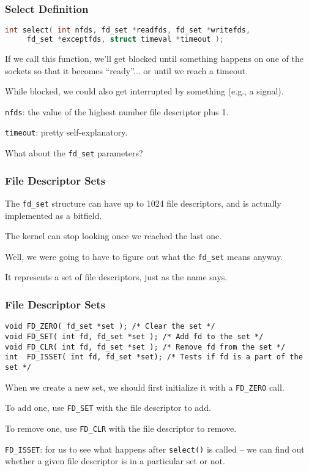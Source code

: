 \begin{frame}[fragile]
	\frametitle{Select Definition}

	\begin{lstlisting}[language=C]
 int select( int nfds, fd_set *readfds, fd_set *writefds, 
     fd_set *exceptfds, struct timeval *timeout );
\end{lstlisting}

	If we call this function, we'll get blocked until something happens on one of the sockets so that it becomes ``ready''... or until we reach a timeout.

	While blocked, we could also get interrupted by something (e.g., a signal).

	\texttt{nfds}: the value of the highest number file descriptor plus 1.

	\texttt{timeout}: pretty self-explanatory.

	What about the \texttt{fd\_set} parameters?

\end{frame}

\begin{frame}
	\frametitle{File Descriptor Sets}

	The \texttt{fd\_set} structure can have up to 1024 file descriptors, and is actually implemented as a bitfield.

	The kernel can stop looking once we reached the last one.

	Well, we were going to have to figure out what the \texttt{fd\_set} means anyway.

	It represents a set of file descriptors, just as the name says.

\end{frame}

\begin{frame}[fragile]
	\frametitle{File Descriptor Sets}

	\begin{lstlisting}
void FD_ZERO( fd_set *set ); /* Clear the set */
void FD_SET( int fd, fd_set *set ); /* Add fd to the set */
void FD_CLR( int fd, fd_set *set ); /* Remove fd from the set */
int  FD_ISSET( int fd, fd_set *set); /* Tests if fd is a part of the set */ 
\end{lstlisting}

	When we create a new set, we should first initialize it with a \texttt{FD\_ZERO} call.

	To add one, use \texttt{FD\_SET} with the file descriptor to add.

	To remove one, use \texttt{FD\_CLR} with the file descriptor to remove.

	\texttt{FD\_ISSET}: for us to see what happens after \texttt{select()} is called -- we can find out whether a given file descriptor is in a particular set or not.

\end{frame}

